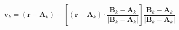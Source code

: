 \documentclass[border=2pt,varwidth]{standalone}
\begin{document}
\[
  \mathbf{v}_k =
  \left ( \mathbf{r} - \mathbf{A}_k \right ) -
  \left [
    \left ( \mathbf{r} - \mathbf{A}_k \right )
    \cdot
    \frac{\mathbf{B}_k - \mathbf{A}_k}
         {\left | \mathbf{B}_k - \mathbf{A}_k \right |}
  \right ]
  \frac{\mathbf{B}_k - \mathbf{A}_k}
       {\left | \mathbf{B}_k - \mathbf{A}_k \right |}
\]
\end{document}
